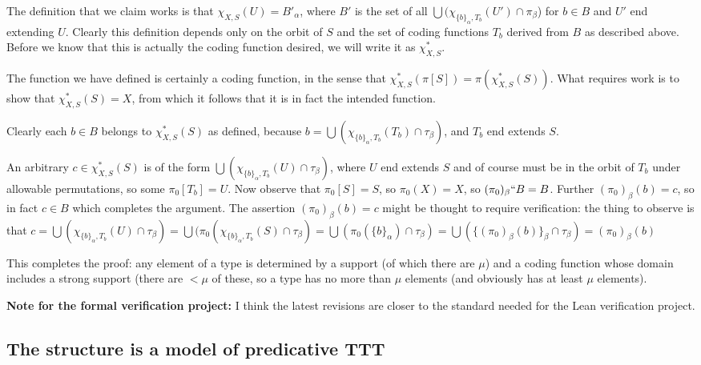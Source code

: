 \documentclass[112pt]{article}
\begin{document}
\begin{description}
The definition that we claim works is that $\chi_{X,S}(U) = B'_\alpha$, where $B'$ is the set of all $\bigcup (\chi_{\{b\}_\alpha,T_b}(U')\cap \pi_\beta$) for $b \in B$ and $U'$ end extending $U$.  Clearly this definition depends only on the orbit of $S$ and the set of coding functions $T_b$ derived from $B$ as described above.  Before we know that this is actually the coding function desired, we will write it as $\chi_{X,S}^*$.

The function we have defined is certainly a coding function, in the sense that $\chi_{X,S}^*(\pi[S]) = \pi(\chi_{X,S}^*(S))$.  What requires work is to show that
$\chi_{X,S}^*(S)=X$, from which it follows that it is in fact the intended function.

Clearly each $b \in B$ belongs to $\chi^*_{X,S}(S)$ as defined, because $b = \bigcup (\chi_{\{b\}_\alpha,T_b}(T_b)\cap \tau_{\beta})$, and $T_b$ end extends $S$.

An arbitrary $c \in \chi_{X,S}^*(S)$ is of the form $\bigcup (\chi_{\{b\}_\alpha,T_b}(U)\cap \tau_{\beta})$, where $U$ end extends $S$ and of course must be in the orbit of $T_b$ under allowable permutations, so some $\pi_0[T_b] = U$. Now observe that $\pi_0[S]=S$, so $\pi_0(X)=X$, so
$(\pi_0)_\beta``B=B$.  Further $(\pi_0)_\beta(b) = c$, so in fact $c \in B$ which completes the argument.  The assertion $(\pi_0)_\beta(b) = c$ might be thought to require verification:   the thing to observe is that $c=\bigcup (\chi_{\{b\}_\alpha,T_b}(U) \cap \tau_\beta)=\bigcup(\pi_0(\chi_{\{b\}_\alpha,T_b}(S)\cap \tau_\beta)=
\bigcup (\pi_0(\{b\}_\alpha)\cap \tau_\beta) =\bigcup(\{(\pi_0)_\beta(b)\}_\beta \cap \tau_\beta) = (\pi_0)_\beta(b)$


\end{description}

This completes the proof:  any element of a type is determined by a support (of which there are $\mu$) and a coding function whose domain includes a strong support (there are $<\mu$ of these, so a type has no more than $\mu$ elements (and obviously has at least $\mu$ elements).


{\bf Note for the formal verification project:}  I think the latest revisions are closer to the standard needed for the Lean verification project.
\newpage
\subsection{The structure is a model of predicative TTT}
\end{document}

